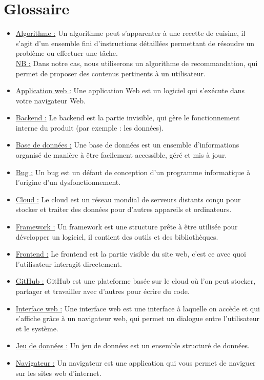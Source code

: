 \documentclass[a4paper,12pt]{report}
\begin{document}
\chapter*{Glossaire}
\begin{itemize}
    \item \underline{Algorithme :} Un algorithme peut s’apparenter à une recette de cuisine, il s’agit d’un ensemble fini d’instructions détaillées permettant de résoudre un problème ou effectuer une tâche.\\
    \underline{NB :} Dans notre cas, nous utiliserons un algorithme de recommandation, qui permet de proposer des contenus pertinents à un utilisateur.
    \item \underline{Application web :} Une application Web est un logiciel qui s'exécute dans votre navigateur Web.
    \item \underline{Backend :} Le backend est la partie invisible, qui gère le fonctionnement interne du produit (par exemple : les données).
    \item \underline{Base de données :} Une base de données est un ensemble d'informations organisé de manière à être facilement accessible, géré et mis à jour.
    \item \underline{Bug :} Un bug est un défaut de conception d'un programme informatique à l'origine d'un dysfonctionnement.
    \item \underline{Cloud :} Le cloud est un réseau mondial de serveurs distants conçu pour stocker et traiter des données pour d'autres appareils et ordinateurs.
    \item \underline{Framework :} Un framework est une structure prête à être utilisée pour développer un logiciel, il contient des outils et des bibliothèques.
    \item \underline{Frontend :} Le frontend est la partie visible du site web, c'est ce avec quoi l'utilisateur interagit directement.
    \item \underline{GitHub :} GitHub est une plateforme basée sur le cloud où l'on peut stocker, partager et travailler avec d'autres pour écrire du code.
    \item \underline{Interface web :} Une interface web est une interface  à laquelle on accède et qui s'affiche grâce à un navigateur web, qui permet un dialogue entre l'utilisateur et le système.
    \item \underline{Jeu de données :} Un jeu de données est un ensemble structuré de données. 
    \item \underline{Navigateur :} Un navigateur est une application qui vous permet de naviguer sur les sites web d'internet.

\end{itemize}
\end{document}
